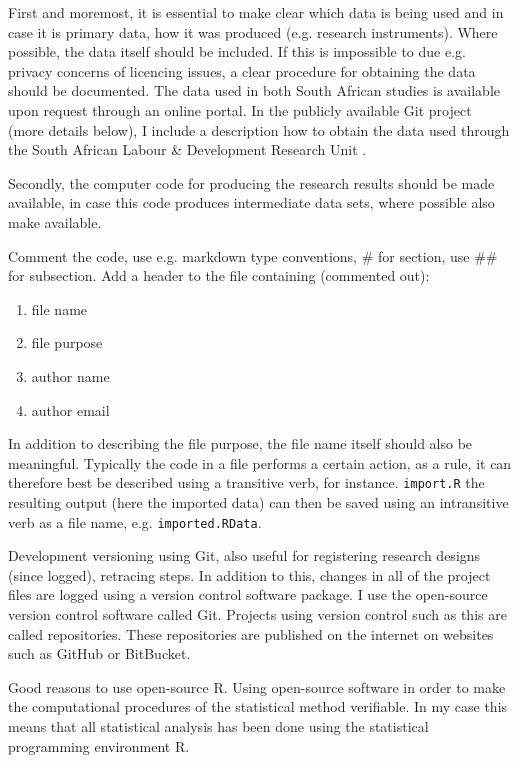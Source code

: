 \documentclass[a4paper,oneside,british]{book}\usepackage[]{graphicx}\usepackage[]{color}
\newcommand{\code}[1]{\texttt{#1}}
\begin{document}
First and moremost, it is essential to make clear which data is being
used and in case it is primary data, how it was produced (e.g. research
instruments). Where possible, the data itself should be included.
If this is impossible to due e.g. privacy concerns of licencing issues,
a clear procedure for obtaining the data should be documented. The
data used in both South African studies is available upon request
through an online portal. In the publicly available Git project (more
details below), I include a description how to obtain the data used
through the South African Labour \& Development Research Unit .

Secondly, the computer code for producing the research results should
be made available, in case this code produces intermediate data sets,
where possible also make available.

Comment the code, use e.g. markdown type conventions, \# for section,
use \#\# for subsection. Add a header to the file containing (commented
out):
\begin{enumerate}
\item file name
\item file purpose
\item author name
\item author email
\end{enumerate}
In addition to describing the file purpose, the file name itself should
also be meaningful. Typically the code in a file performs a certain
action, as a rule, it can therefore best be described using a transitive
verb, for instance. \code{import.R} the resulting output (here the
imported data) can then be saved using an intransitive verb as a file
name, e.g. \code{imported.RData}.

Development versioning using Git, also useful for registering research
designs (since logged), retracing steps. In addition to this, changes
in all of the project files are logged using a version control software
package. I use the open-source version control software called Git.
Projects using version control such as this are called repositories.
These repositories are published on the internet on websites such
as GitHub or BitBucket.

Good reasons to use open-source R. Using open-source software in order
to make the computational procedures of the statistical method verifiable.
In my case this means that all statistical analysis has been done
using the statistical programming environment R. 
\end{document}
